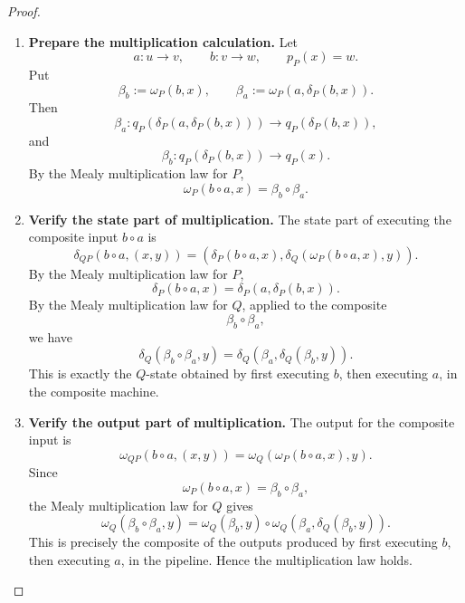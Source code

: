 \begin{proof}
\begin{enumerate}
        \item \textbf{Prepare the multiplication calculation.} Let
        \[
            a:u\to v,
            \qquad
            b:v\to w,
            \qquad
            p_P(x)=w.
        \]
        Put
        \[
            \beta_b:=\omega_P(b,x),
            \qquad
            \beta_a:=\omega_P(a,\delta_P(b,x)).
        \]
        Then
        \[
            \beta_a:q_P(\delta_P(a,\delta_P(b,x)))\to q_P(\delta_P(b,x)),
        \]
        and
        \[
            \beta_b:q_P(\delta_P(b,x))\to q_P(x).
        \]
        By the Mealy multiplication law for \(P\),
        \[
            \omega_P(b\circ a,x)=\beta_b\circ\beta_a.
        \]

        \item \textbf{Verify the state part of multiplication.} The state part of executing the composite input \(b\circ a\) is
        \[
            \delta_{QP}(b\circ a,(x,y))
            =
            \left(
                \delta_P(b\circ a,x),
                \delta_Q(\omega_P(b\circ a,x),y)
            \right).
        \]
        By the Mealy multiplication law for \(P\),
        \[
            \delta_P(b\circ a,x)=\delta_P(a,\delta_P(b,x)).
        \]
        By the Mealy multiplication law for \(Q\), applied to the composite
        \[
            \beta_b\circ\beta_a,
        \]
        we have
        \[
            \delta_Q(\beta_b\circ\beta_a,y)
            =
            \delta_Q(\beta_a,\delta_Q(\beta_b,y)).
        \]
        This is exactly the \(Q\)-state obtained by first executing \(b\), then executing \(a\), in the composite machine.

        \item \textbf{Verify the output part of multiplication.} The output for the composite input is
        \[
            \omega_{QP}(b\circ a,(x,y))
            =
            \omega_Q(\omega_P(b\circ a,x),y).
        \]
        Since
        \[
            \omega_P(b\circ a,x)=\beta_b\circ\beta_a,
        \]
        the Mealy multiplication law for \(Q\) gives
        \[
            \omega_Q(\beta_b\circ\beta_a,y)
            =
            \omega_Q(\beta_b,y)\circ
            \omega_Q(\beta_a,\delta_Q(\beta_b,y)).
        \]
        This is precisely the composite of the outputs produced by first executing \(b\), then executing \(a\), in the pipeline. Hence the multiplication law holds.
    \end{enumerate}
\end{proof}


